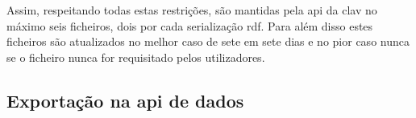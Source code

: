 Assim, respeitando todas estas restrições, são mantidas pela \acrshort{api} da \acrshort{clav} no máximo seis ficheiros, dois por cada serialização \acrshort{rdf}. Para além disso estes ficheiros são atualizados no melhor caso de sete em sete dias e no pior caso nunca se o ficheiro nunca for requisitado pelos utilizadores.

\subsection{Exportação na \acrshort{api} de dados}




